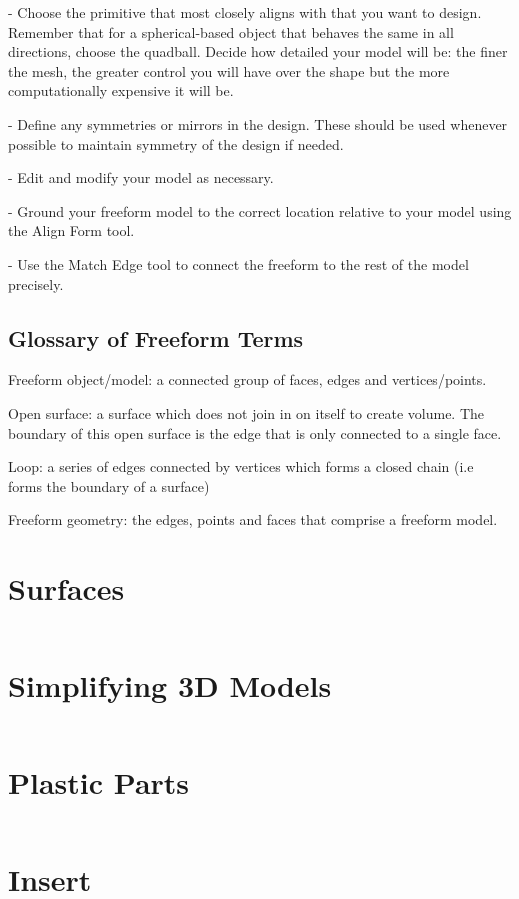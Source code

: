 - Choose the primitive that most closely aligns with that you want to design. Remember that for a spherical-based object that behaves the same in all directions, choose the quadball. Decide how detailed your model will be: the finer the mesh, the greater control you will have over the shape but the more computationally expensive it will be.

- Define any symmetries or mirrors in the design. These should be used whenever possible to maintain symmetry of the design if needed.

- Edit and modify your model as necessary.

- Ground your freeform model to the correct location relative to your model using the Align Form tool.

- Use the Match Edge tool to connect the freeform to the rest of the model precisely.

\subsection{Glossary of Freeform Terms}

Freeform object/model: a connected group of faces, edges and vertices/points.

Open surface: a surface which does not join in on itself to create volume. The boundary of this open surface is the edge that is only connected to a single face.

Loop: a series of edges connected by vertices which forms a closed chain (i.e forms the boundary of a surface)

Freeform geometry: the edges, points and faces that comprise a freeform model.

\section{Surfaces}
\label{section: 3D Model Surface}

$ $

\section{Simplifying 3D Models}

$ $

\section{Plastic Parts}

$ $

\section{Insert}

